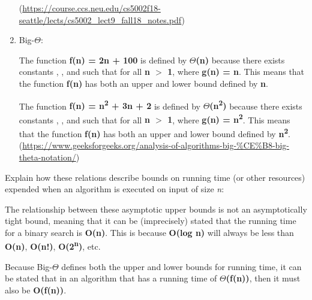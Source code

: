\documentclass{article}
\begin{document}
\begin{enumerate}
        (\url{https://course.ccs.neu.edu/cs5002f18-seattle/lects/cs5002_lect9_fall18_notes.pdf})

        \smallskip

    \item Big-$\Theta$: \\
    
        \smallskip

        The function \textbf{f(n) = 2n + 100} is defined by \textbf{$\Theta$(n)} because there 
        exists constants , , and 
        such that for all \textbf{n $>$ 1}, 
        where \textbf{g(n) = n}. This means that the function \textbf{f(n)} has both an upper
        and lower bound defined by \textbf{n}.

        The function \textbf{f(n) = n\textsuperscript{2} + 3n + 2} is defined by 
        \textbf{$\Theta$(n\textsuperscript{2})} because there 
        exists constants , , and 
        such that for all \textbf{n $>$ 1}, 
        where \textbf{g(n) = n\textsuperscript{2}}. 
        This means that the function \textbf{f(n)} has both an upper
        and lower bound defined by \textbf{n\textsuperscript{2}}. \\

        (\url{https://www.geeksforgeeks.org/analysis-of-algorithms-big-%CE%B8-big-theta-notation/})

        \smallskip

\end{enumerate}

\medskip

\noindent Explain how these relations describe bounds on running time (or other resources)
expended when an algorithm is executed on input of size \textit{n}:

	\medskip
	The relationship between these asymptotic upper bounds is not an asymptotically tight bound,
     meaning that it can be (imprecisely) stated that the running time for a binary search is 
     \textbf{O(n)}. This is because \textbf{O(log n)} will always be less than \textbf{O(n)}, 
     \textbf{O(n!)}, \textbf{O(2\textsuperscript{n})}, etc.
     \smallskip

	Because Big-$\Theta$ defines both the upper and lower bounds for running time, it can be stated 
     that in an algorithm that has a running time of \textbf{$\Theta$(f(n))}, then it must also be 
     \textbf{O(f(n))}. 
     \smallskip
\end{document}
